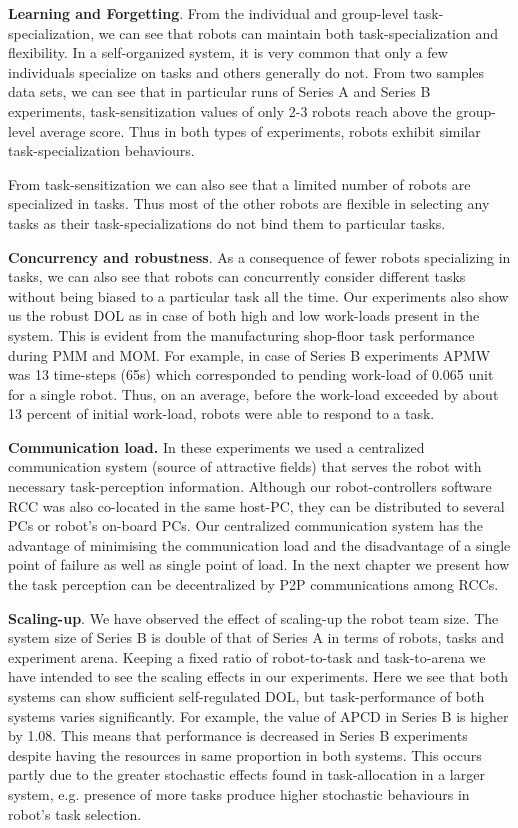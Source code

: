 \documentclass[preprint,12pt]{elsarticle}
\begin{document}
\textbf{Learning and Forgetting}. From the individual and group-level task-\\ specialization, we can see that robots can maintain both task-specialization and flexibility. In a self-organized system, it is very common that only a few individuals specialize on tasks and others generally do not. From two samples data sets, we can see that in particular runs of Series A and Series B experiments, task-sensitization values of  only 2-3 robots reach above the group-level average score. Thus in both types of experiments, robots exhibit similar task-specialization behaviours. 

From task-sensitization we can also see that a limited number of robots are specialized in tasks. Thus most of the other robots are flexible in selecting any tasks as their task-specializations do not bind them to particular tasks.

\textbf{Concurrency and robustness}. As a consequence of fewer robots specializing in tasks, we can also see that robots can concurrently  consider different tasks without being biased to a particular task all the time. Our experiments also show us the robust DOL as in case of  both high and low work-loads present in the system. This is evident from the manufacturing shop-floor task performance during PMM and MOM. For example,  in case of Series B experiments APMW was 13 time-steps (65s) which corresponded  to pending work-load of 0.065 unit for a single robot. Thus, on an average, before the work-load exceeded by about 13 percent of initial work-load, robots were able to respond to  a task.

\textbf{Communication load.} In these experiments we used a centralized communication system (source of attractive fields) that serves the robot with necessary task-perception information. Although our robot-controllers software RCC was also co-located in the same host-PC, they can be distributed to several PCs or robot's on-board PCs. Our centralized communication system has the advantage of minimising the communication load and the disadvantage of a single point of failure as well as single point of load. In the next chapter we present how the task perception can be decentralized by P2P communications among RCCs.

\textbf{Scaling-up}. We have observed the effect of scaling-up the robot team size. The system size of Series B is double of that of Series A in terms of robots, tasks and experiment arena. Keeping a fixed ratio of robot-to-task and task-to-arena we have intended to see the scaling effects in our experiments. Here we see that both systems can show sufficient self-regulated DOL, but task-performance of both systems varies significantly. For example, the value of APCD in Series B is higher by 1.08. This means that performance  is decreased in Series B experiments despite having the resources in same proportion in both systems. This occurs partly due to the greater stochastic effects found in task-allocation in a larger system, e.g. presence of more tasks produce higher stochastic behaviours in robot's task selection.
\end{document}
